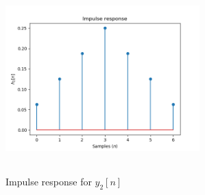 \begin{enumerate}
\begin{marginfigure}
    \includegraphics[width=7.5cm,height=6.5cm]{ch10/figures/h2.png}
    \caption{Impulse response for $y_{2}[n]$}
    \label{h2}
\end{marginfigure}



\end{enumerate}
